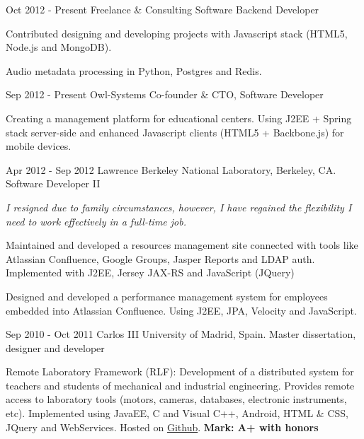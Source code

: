 
\experience
  {Oct 2012 - Present}
  {Freelance \& Consulting}
  {Software Backend Developer}
  {\vspace{-1em}\begin{rlist}
    \item Contributed designing and developing projects with Javascript stack
    (HTML5, Node.js and MongoDB).
    \item Audio metadata processing in Python, Postgres and Redis.
  \end{rlist}}

\experience
  {Sep 2012 - Present}
  {Owl-Systems}
  {Co-founder \& CTO, Software Developer}
  {\vspace{-1em}\begin{rlist}
    \item Creating a management platform for educational centers. Using J2EE +
    Spring stack server-side and enhanced Javascript clients (HTML5 +
    Backbone.js) for mobile devices.
  \end{rlist}}

\experience
  {Apr 2012 - Sep 2012}
  {Lawrence Berkeley National Laboratory, Berkeley, CA.}
  {Software Developer II}
  {\emph{I resigned due to family circumstances, however, I have
    regained the flexibility I need to work effectively in a full-time
    job.}
    \begin{rlist}
    \item Maintained and developed a resources management site
    connected with tools like Atlassian Confluence, Google Groups, Jasper
    Reports and LDAP auth. Implemented with J2EE, Jersey JAX-RS and
    JavaScript (JQuery)
    \item Designed and developed a performance management system for
    employees embedded into Atlassian Confluence. Using J2EE, JPA,
    Velocity and JavaScript.
  \end{rlist}}

\experience
  {Sep 2010 - Oct 2011}
  {Carlos III University of Madrid, Spain.}
  {Master dissertation, designer and developer}
  {\vspace{-1em}\begin{rlist}
    \item Remote Laboratory Framework (RLF): Development of a distributed
    system for teachers and students of mechanical and industrial
    engineering. Provides remote access to laboratory tools (motors,
    cameras, databases, electronic instruments, etc).
    Implemented using JavaEE, C and Visual C++,
    Android, HTML \& CSS, JQuery and WebServices. Hosted on \href{https://github.com/CarlosMecha/remote-laboratory-framework}{Github}.
    \textbf{Mark: A+ with honors}
  \end{rlist}}

